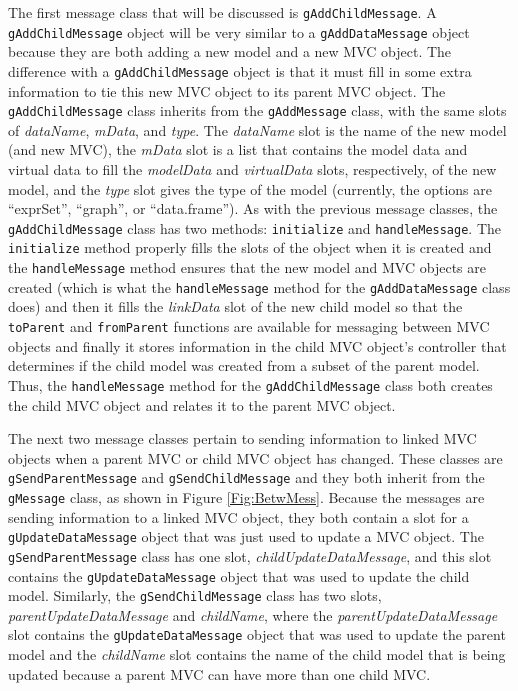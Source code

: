 \documentclass{article}[11pt]
\newcommand{\Rfunction}[1]{{\texttt{#1}}}
\newcommand{\Robject}[1]{{\texttt{#1}}}
\newcommand{\Rslot}[1]{\textsl{#1}}
\begin{document}
The first message class that will be discussed is \Robject{gAddChildMessage}.
A \Robject{gAddChildMessage} object will be very similar to a
\Robject{gAddDataMessage} object because they are both adding a new
model and a new MVC object.  The difference with a \Robject{gAddChildMessage}
object is that it must fill in some extra information to tie this new MVC
object to its parent MVC object.  The \Robject{gAddChildMessage} class
inherits from the \Robject{gAddMessage} class, with the same slots of
\Rslot{dataName}, \Rslot{mData}, and \Rslot{type}.  The \Rslot{dataName} slot
is the name of the new model (and new MVC), the \Rslot{mData} slot is a list
that contains the model data and virtual data to fill the \Rslot{modelData}
and \Rslot{virtualData} slots, respectively, of the new model, and the
\Rslot{type} slot gives the type of the model (currently, the options are
``exprSet'', ``graph'', or ``data.frame'').  As with the previous message
classes, the \Robject{gAddChildMessage} class has two methods:
\Rfunction{initialize} and \Rfunction{handleMessage}.  The
\Rfunction{initialize} method properly fills the slots of the object when it
is created and the \Rfunction{handleMessage} method ensures that the new model
and MVC objects are created (which is what the \Rfunction{handleMessage}
method for the \Robject{gAddDataMessage} class does) and then it fills the
\Rslot{linkData} slot of the new child model so that the \Rfunction{toParent}
and \Rfunction{fromParent} functions are available for messaging between MVC
objects and finally it stores information in the child MVC object's controller
that determines if the child model was created from a subset of the parent
model.  Thus, the \Rfunction{handleMessage} method for the
\Robject{gAddChildMessage} class both creates the child MVC object and relates
it to the parent MVC object. 

The next two message classes pertain to sending information to linked MVC
objects when a parent MVC or child MVC object has changed.  These classes are
\Robject{gSendParentMessage} and \Robject{gSendChildMessage} and they both
inherit from the \Robject{gMessage} class, as shown in Figure
\ref{Fig:BetwMess}.  Because the messages are sending information to a linked
MVC object, they both contain a slot for a \Robject{gUpdateDataMessage} object
that was just used to update a MVC object.  The \Robject{gSendParentMessage}
class has one slot, \Rslot{childUpdateDataMessage}, and this slot contains the
\Robject{gUpdateDataMessage} object that was used to update the child model.
Similarly, the \Robject{gSendChildMessage} class has two slots,
\Rslot{parentUpdateDataMessage} and \Rslot{childName}, where the
\Rslot{parentUpdateDataMessage} slot contains the \Robject{gUpdateDataMessage}
object that was used to update the parent model and the \Rslot{childName} slot
contains the name of the child model that is being updated because a parent
MVC can have more than one child MVC.  
\end{document}
